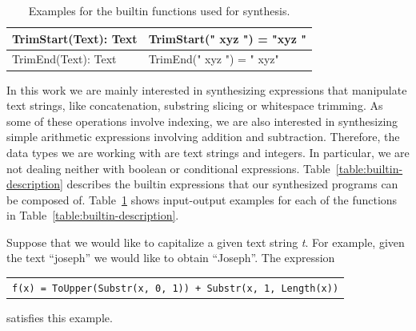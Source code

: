 \begin{table}[]
{\begin{tabular}{@{}ll@{}}
      TrimStart(Text): Text
      & TrimStart("    xyz    ") = "xyz    "
      \\ \midrule

      TrimEnd(Text): Text
      & TrimEnd("    xyz    ") = "    xyz"
      \\ \midrule


    \end{tabular}}
  \caption{Examples for the builtin functions used for synthesis.}
  \label{table:builtin-examples}
\end{table}

In this work we are mainly interested in synthesizing expressions that
manipulate text strings, like concatenation, substring slicing or whitespace
trimming. As some of these operations involve indexing, we are also interested
in synthesizing simple arithmetic expressions involving addition and
subtraction. Therefore, the data types we are working with are text strings and
integers. In particular, we are not dealing neither with boolean or conditional
expressions. Table~\ref{table:builtin-description} describes the builtin
expressions that our synthesized programs can be composed of.
Table~\ref{table:builtin-examples} shows input-output examples for each of the
functions in Table~\ref{table:builtin-description}.

\begin{example}
  Suppose that we would like to capitalize a given text string \textit{t}. For
example, given the text ``joseph'' we would like to obtain ``Joseph''. The
expression


\begin{center}
\begin{tabular}{l}
\texttt{f(x) = ToUpper(Substr(x, 0, 1)) + Substr(x, 1, Length(x))}\\
\end{tabular}
\end{center}

\noindent
satisfies this example.
\end{example}


